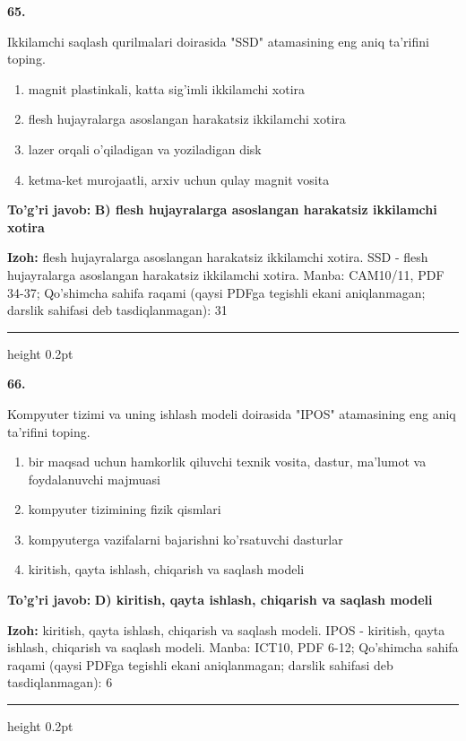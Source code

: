 \documentclass[10pt,a4paper]{article}
\begin{document}
{\bfseries\sffamily\color{ink} 65.}
\par
Ikkilamchi saqlash qurilmalari doirasida "SSD" atamasining eng aniq ta'rifini toping.
\begin{enumerate}[label=\Alph*),leftmargin=9mm]
\item magnit plastinkali, katta sig'imli ikkilamchi xotira
\item flesh hujayralarga asoslangan harakatsiz ikkilamchi xotira
\item lazer orqali o'qiladigan va yoziladigan disk
\item ketma-ket murojaatli, arxiv uchun qulay magnit vosita
\end{enumerate}
\begin{tcolorbox}[enhanced,breakable,colback=teal!4,colframe=teal!60!black,boxrule=0.45pt,arc=1.2mm,left=2.7mm,right=2.7mm,top=1.8mm,bottom=1.8mm,before skip=2mm,after skip=2mm]
{\bfseries\sffamily\color{teal}To'g'ri javob:} \textbf{B) flesh hujayralarga asoslangan harakatsiz ikkilamchi xotira}
\par\smallskip
{\bfseries Izoh:} flesh hujayralarga asoslangan harakatsiz ikkilamchi xotira. SSD - flesh hujayralarga asoslangan harakatsiz ikkilamchi xotira. Manba: CAM10/11, PDF 34-37; Qo'shimcha sahifa raqami (qaysi PDFga tegishli ekani aniqlanmagan; darslik sahifasi deb tasdiqlanmagan): 31
\end{tcolorbox}
\vspace{2mm}\hrule height 0.2pt\vspace{3mm}

{\bfseries\sffamily\color{ink} 66.}
\par
Kompyuter tizimi va uning ishlash modeli doirasida "IPOS" atamasining eng aniq ta'rifini toping.
\begin{enumerate}[label=\Alph*),leftmargin=9mm]
\item bir maqsad uchun hamkorlik qiluvchi texnik vosita, dastur, ma'lumot va foydalanuvchi majmuasi
\item kompyuter tizimining fizik qismlari
\item kompyuterga vazifalarni bajarishni ko'rsatuvchi dasturlar
\item kiritish, qayta ishlash, chiqarish va saqlash modeli
\end{enumerate}
\begin{tcolorbox}[enhanced,breakable,colback=teal!4,colframe=teal!60!black,boxrule=0.45pt,arc=1.2mm,left=2.7mm,right=2.7mm,top=1.8mm,bottom=1.8mm,before skip=2mm,after skip=2mm]
{\bfseries\sffamily\color{teal}To'g'ri javob:} \textbf{D) kiritish, qayta ishlash, chiqarish va saqlash modeli}
\par\smallskip
{\bfseries Izoh:} kiritish, qayta ishlash, chiqarish va saqlash modeli. IPOS - kiritish, qayta ishlash, chiqarish va saqlash modeli. Manba: ICT10, PDF 6-12; Qo'shimcha sahifa raqami (qaysi PDFga tegishli ekani aniqlanmagan; darslik sahifasi deb tasdiqlanmagan): 6
\end{tcolorbox}
\vspace{2mm}\hrule height 0.2pt\vspace{3mm}
\end{document}

